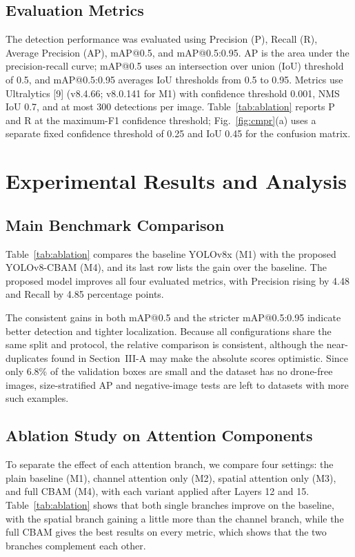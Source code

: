 \documentclass[conference]{IEEEtran}
\begin{document}
\subsection{Evaluation Metrics}

The detection performance was evaluated using Precision (P), Recall (R), Average Precision (AP), mAP@0.5, and mAP@0.5:0.95. AP is the area under the precision-recall curve; mAP@0.5 uses an intersection over union (IoU) threshold of 0.5, and mAP@0.5:0.95 averages IoU thresholds from 0.5 to 0.95. Metrics use Ultralytics [9] (v8.4.66; v8.0.141 for M1) with confidence threshold 0.001, NMS IoU 0.7, and at most 300 detections per image. Table~\ref{tab:ablation} reports P and R at the maximum-F1 confidence threshold; Fig.~\ref{fig:cmpr}(a) uses a separate fixed confidence threshold of 0.25 and IoU 0.45 for the confusion matrix.

\section{Experimental Results and Analysis}

\subsection{Main Benchmark Comparison}

Table~\ref{tab:ablation} compares the baseline YOLOv8x (M1) with the proposed YOLOv8-CBAM (M4), and its last row lists the gain over the baseline. The proposed model improves all four evaluated metrics, with Precision rising by 4.48 and Recall by 4.85 percentage points.

The consistent gains in both mAP@0.5 and the stricter mAP@0.5:0.95 indicate better detection and tighter localization. Because all configurations share the same split and protocol, the relative comparison is consistent, although the near-duplicates found in Section~III-A may make the absolute scores optimistic. Since only 6.8\% of the validation boxes are small and the dataset has no drone-free images, size-stratified AP and negative-image tests are left to datasets with more such examples.


\subsection{Ablation Study on Attention Components}

To separate the effect of each attention branch, we compare four settings: the plain baseline (M1), channel attention only (M2), spatial attention only (M3), and full CBAM (M4), with each variant applied after Layers 12 and 15. Table~\ref{tab:ablation} shows that both single branches improve on the baseline, with the spatial branch gaining a little more than the channel branch, while the full CBAM gives the best results on every metric, which shows that the two branches complement each other.
\end{document}

